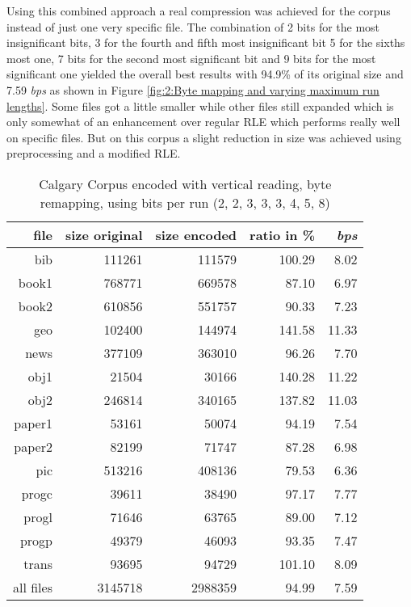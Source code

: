 \par{
Using this combined approach a real compression was achieved for the corpus instead of just one very specific file. The combination of 2 bits for the most insignificant bits, 3 for the fourth and fifth most insignificant bit 5 for the sixths most one, 7 bits for the second most significant bit and 9 bits for the most significant one yielded the overall best results with 94.9\% of its original size and 7.59 \textit{bps} as shown in Figure \ref{fig:2:Byte mapping and varying maximum run lengths}. Some files got a little smaller while other files still expanded which is only somewhat of an enhancement over regular RLE which performs really well on specific files. But on this corpus a slight reduction in size was achieved using preprocessing and a modified RLE.
\begin{table}[h]
	\centering
	\begin{tabular}{r|r|r|r|r}	
		file & size original & size encoded & ratio in \% & \textit{bps}\\
		\hline
bib & 111261 & 111579 & 100.29 & 8.02 \\
book1 & 768771 & 669578 & 87.10 & 6.97 \\
book2 & 610856 & 551757 & 90.33 & 7.23 \\
geo & 102400 & 144974 & 141.58 & 11.33 \\
news & 377109 & 363010 & 96.26 & 7.70 \\
obj1 & 21504 & 30166 & 140.28 & 11.22 \\
obj2 & 246814 & 340165 & 137.82 & 11.03 \\
paper1 & 53161 & 50074 & 94.19 & 7.54 \\
paper2 & 82199 & 71747 & 87.28 & 6.98 \\
pic & 513216 & 408136 & 79.53 & 6.36 \\
progc & 39611 & 38490 & 97.17 & 7.77 \\
progl & 71646 & 63765 & 89.00 & 7.12 \\
progp & 49379 & 46093 & 93.35 & 7.47 \\
trans & 93695 & 94729 & 101.10 & 8.09 \\
		\hline
		all files & 3145718 & 2988359 & 94.99 & 7.59
	\end{tabular}
	\caption{Calgary Corpus encoded with vertical reading, byte remapping, using bits per run (2, 2, 3, 3, 3, 4, 5, 8)}
\label{tab:t43 Calgary Corpus encoded with vertical reading, byte remapping and varying bits per run}
\end{table}
}

